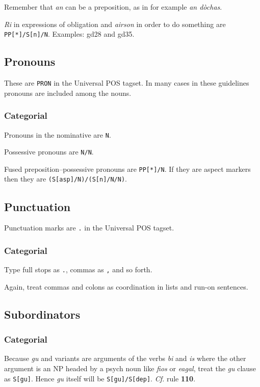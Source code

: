 \documentclass[a4paper]{article}
\begin{document}
 Remember that \textit{an} can be a preposition, as in for example \textit{an d\`ochas}.

 \textit{Ri} in expressions of obligation and \textit{airson} in order to do something are \texttt{PP[*]/S[n]/N}. Examples: gd28 and gd35.

\subsection{Pronouns\label{subsect:pronouns}}

These are \texttt{PRON} in the Universal POS tagset. In many cases in these guidelines pronouns are included among the nouns.



\subsubsection*{Categorial}

 Pronouns in the nominative are \texttt{N}.

 Possessive pronouns are \texttt{N/N}.

 Fused preposition--possessive pronouns are \texttt{PP[*]/N}.
If they are aspect markers then they are \texttt{(S[asp]/N)/(S[n]/N/N)}.

\subsection{Punctuation\label{subsect:punctuation}}

Punctuation marks are \texttt{.} in the Universal POS tagset.


\subsubsection*{Categorial}

 Type full stops as \texttt{.}, commas as \texttt{,} and so forth.

 Again, treat commas and colons as coordination in lists and run-on sentences.

\subsection{Subordinators\label{subsect:subordinators}}

\subsubsection*{Categorial}
 Because \textit{gu} and variants are arguments of the verbs \textit{bi} and \textit{is} where the other argument is an NP headed by a psych noun like \textit{fios} or \textit{eagal}, treat the \textit{gu} clause as \texttt{S[gu]}.
Hence \textit{gu} itself will be \texttt{S[gu]/S[dep]}.
\textit{Cf.} rule \textbf{110}. 
\end{document}
